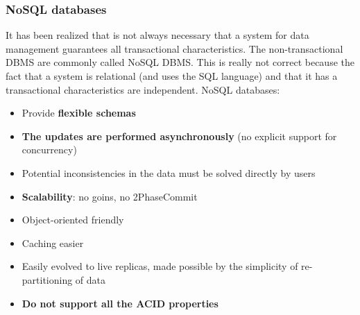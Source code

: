 \documentclass[10pt,a4paper]{article}
\begin{document}
\subsubsection{NoSQL databases}
It has been realized that is not always necessary that a system for data management guarantees all transactional characteristics. The non-transactional DBMS are commonly called NoSQL DBMS. This is really not correct because the fact that a system is relational (and uses the SQL language) and that it has a transactional characteristics are independent.
NoSQL databases:
\begin{itemize}
	\item Provide \textbf{flexible schemas}
	\item \textbf{The updates are performed asynchronously} (no explicit support for concurrency)
	\item Potential inconsistencies in the data must be solved directly by users
	\item \textbf{Scalability}: no goins, no 2PhaseCommit
	\item Object-oriented friendly
	\item Caching easier
	\item Easily evolved to live replicas, made possible by the simplicity of re-partitioning of data
	\item \textbf{Do not support all the ACID properties}
\end{itemize}
\pagebreak
\end{document}
